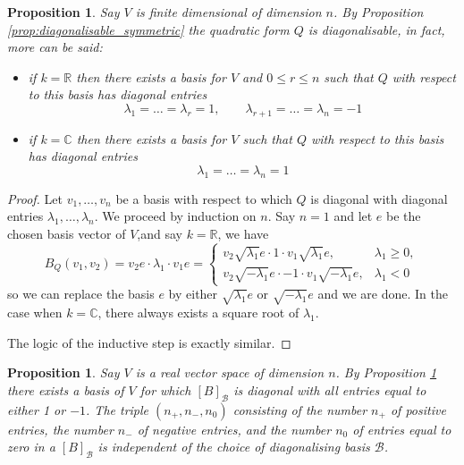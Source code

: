 \documentclass[12pt]{article}
\theoremstyle{plain}
\newtheorem{proposition}[thm]{Proposition}
\theoremstyle{definition}
\newcommand{\bb}[1]{\mathbb{#1}}
\newcommand{\scr}[1]{\mathscr{#1}}
\begin{document}
\begin{proposition}\label{prop:one_negative_one}
	Say $V$ is finite dimensional of dimension $n$. By Proposition \ref{prop:diagonalisable_symmetric} the quadratic form $Q$ is diagonalisable, in fact, more can be said:
	\begin{itemize}
		\item if $k = \bb{R}$ then there exists a basis for $V$ and $0 \leq r \leq n$ such that $Q$ with respect to this basis has diagonal entries
		\begin{equation}
			\lambda_1 = \hdots = \lambda_r = 1, \qquad \lambda_{r+1} = \hdots = \lambda_n = -1
		\end{equation}
		\item if $k = \bb{C}$ then there exists a basis for $V$ such that $Q$ with respect to this basis has diagonal entries
		\begin{equation}
			\lambda_1 = \hdots = \lambda_n = 1
		\end{equation}
	\end{itemize}
\end{proposition}
\begin{proof}
	Let $v_1,\hdots,v_n$ be a basis with respect to which $Q$ is diagonal with diagonal entries $\lambda_1,\hdots,\lambda_n$. We proceed by induction on $n$. Say $n = 1$ and let $e$ be the chosen basis vector of $V$,and say $k = \bb{R}$,  we have
	\begin{equation}
		B_Q(v_1,v_2) = v_2e\cdot \lambda_1 \cdot v_1 e =
		\begin{cases}
			v_2 \sqrt{\lambda_1}e\cdot 1 \cdot v_1\sqrt{\lambda_1} e,&\lambda_1 \geq 0,\\
			v_2 \sqrt{-\lambda_1}e\cdot -1 \cdot v_1\sqrt{-\lambda_1} e,& \lambda_1 < 0
		\end{cases}
	\end{equation}
	so we can replace the basis $e$ by either $\sqrt{\lambda_1}e$ or $\sqrt{-\lambda_1}e$ and we are done. In the case when $k = \bb{C}$, there always exists a square root of $\lambda_1$.
	
	The logic of the inductive step is exactly similar.
\end{proof}
\begin{proposition}\label{prop:signature}
	Say $V$ is a real vector space of dimension $n$. By Proposition \ref{prop:one_negative_one} there exists a basis of $V$ for which $[B]_{\scr{B}}$ is diagonal with all entries equal to either 1 or $-1$. The triple $(n_{+},n_{-},n_0)$ consisting of the number $n_{+}$ of positive entries, the number $n_{-}$ of negative entries, and the number $n_{0}$ of entries equal to zero in a $[B]_{\scr{B}}$ is independent of the choice of diagonalising basis $\scr{B}$. 
\end{proposition}
\end{document}
